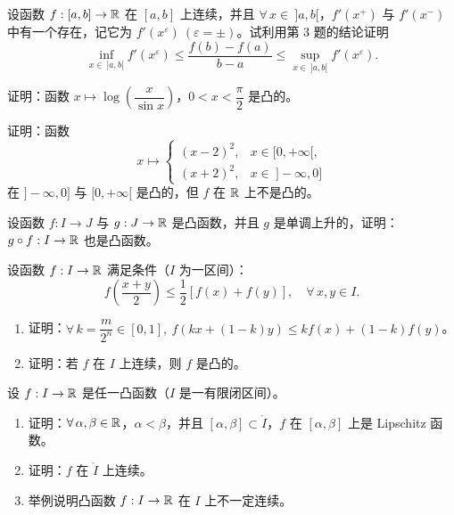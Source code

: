 \begin{exercise}
	\item 设函数 \(f:[a,b]\to\mathbb{R}\) 在 \([a,b]\) 上连续，并且 \(\forall\,x\in\ ]a,b[\)，\(f'(x^+)\) 与 \(f'(x^-)\) 中有一个存在，记它为 \(f'(x^\varepsilon)\ (\varepsilon=\pm)\)。试利用第 3 题的结论证明
	\[
	\inf_{x\in\ ]a,b[}f'(x^\varepsilon)\le\frac{f(b)-f(a)}{b-a}\le\sup_{x\in\ ]a,b[}f'(x^\varepsilon).
	\]
\end{exercise}

\begin{exercise}
	\item 证明：函数 \(x\longmapsto\log\left(\dfrac{x}{\sin x}\right)\)，\(0<x<\dfrac\pi2\) 是凸的。
\end{exercise}

\begin{exercise}
	\item 证明：函数
	\[
	x\longmapsto\begin{cases} (x-2)^2, & x\in[0,+\infty[, \\ (x+2)^2, & x\in\ ]-\infty,0] \end{cases}
	\]
	在 \(]-\infty,0]\) 与 \([0,+\infty[\) 是凸的，但 \(f\) 在 \(\mathbb{R}\) 上不是凸的。
\end{exercise}

\begin{exercise}
	\item 设函数 \(f:I\to J\) 与 \(g:J\to\mathbb{R}\) 是凸函数，并且 \(g\) 是单调上升的，证明：\(g\circ f:I\to\mathbb{R}\) 也是凸函数。
\end{exercise}

\begin{exercise}
	\item 设函数 \(f:I\to\mathbb{R}\) 满足条件（\(I\) 为一区间）：
	\[
	f\left(\frac{x+y}{2}\right)\le\frac12[f(x)+f(y)],\quad\forall\,x,y\in I.
	\]
	\begin{enumerate}[label=\arabic*)]
		\item 证明：\(\forall\,k=\dfrac m{2^n}\in[0,1],\ f(kx+(1-k)y)\le kf(x)+(1-k)f(y)\)。
		\item 证明：若 \(f\) 在 \(I\) 上连续，则 \(f\) 是凸的。
	\end{enumerate}
\end{exercise}

\begin{exercise}
	\item 设 \(f:I\to\mathbb{R}\) 是任一凸函数（\(I\) 是一有限闭区间）。
	\begin{enumerate}[label=\arabic*)]
		\item 证明：\(\forall\,\alpha,\beta\in\mathbb{R}\)，\(\alpha<\beta\)，并且 \([\alpha,\beta]\subset\mathring I\)，\(f\) 在 \([\alpha,\beta]\) 上是 Lipschitz 函数。
		\item 证明：\(f\) 在 \(\mathring I\) 上连续。
		\item 举例说明凸函数 \(f:I\to\mathbb{R}\) 在 \(I\) 上不一定连续。
	\end{enumerate}
\end{exercise}

